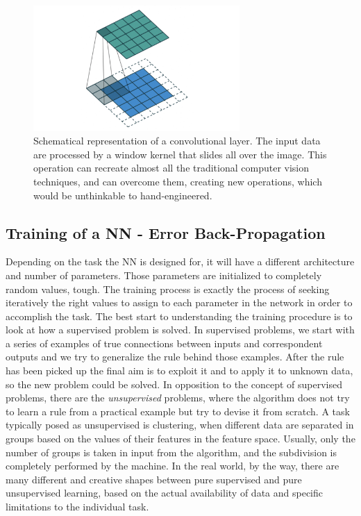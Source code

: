 \begin{figure}
    \centering
    \includegraphics[width = 0.7\textwidth]{images/CL}
    \caption{Schematical representation of a convolutional layer. The input data are processed by a window kernel that slides all over the image. This operation can recreate almost all the traditional computer vision techniques, and can overcome them, creating new operations, which would be unthinkable to hand-engineered.}
    \label{fig:convolutional}
\end{figure}

\subsection{Training of a NN -  Error Back-Propagation}
Depending on the task the NN is designed for, it will have a different architecture and number of parameters. Those parameters are initialized to completely random values, tough. The training process is exactly the process of seeking iteratively the right values to assign to each parameter in the network in order to accomplish the task. The best start to understanding the training procedure is to look at how a supervised problem is solved. In supervised problems, we start with a series of examples of true connections between inputs and correspondent outputs and we try to generalize the rule behind those examples. After the rule has been picked up the final aim is to exploit it and to apply it to unknown data, so the new problem could be solved. In opposition to the concept of supervised problems, there are the \textit{unsupervised} problems, where the algorithm does not try to learn a rule from a practical example but try to devise it from scratch. A task typically posed as unsupervised is clustering, when different data are separated in groups based on the values of their features in the feature space. Usually, only the number of groups is taken in input from the algorithm, and the subdivision is completely performed by the machine. In the real world, by the way, there are many different and creative shapes between pure supervised and pure unsupervised learning, based on the actual availability of data and specific limitations to the individual task.

